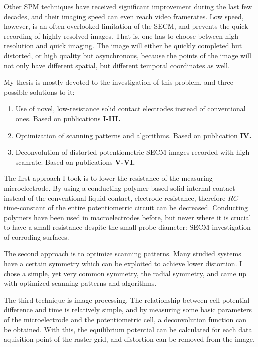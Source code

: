 Other SPM techniques have received significant improvement during the last few decades, and their imaging speed can even reach video framerates.
Low speed, however, is an often overlooked limitation of the SECM, and prevents the quick recording of highly resolved images.
That is, one has to choose between high resolution and quick imaging.
The image will either be quickly completed but distorted, or high quality but asynchronous, because the points of the image will not only have different spatial, but different temporal coordinates as well.

My thesis is mostly devoted to the investigation of this problem, and three possible solutions to it:

\begin{enumerate}
\item Use of novel, low-resistance solid contact electrodes instead of conventional ones.
Based on publications \textbf{\color{blue}I-III.}
\item Optimization of scanning patterns and algorithms.
Based on publication \textbf{\color{blue}IV.}
\item Deconvolution of distorted potentiometric SECM images recorded with high scanrate.
Based on publications \textbf{\color{blue}V-VI.}
\end{enumerate}

The first approach I took is to lower the resistance of the measuring microelectrode.
By using a conducting polymer based solid internal contact instead of the conventional liquid contact, electrode resistance, therefore $RC$ time-constant of the entire potentiometric circuit can be decreased.
Conducting polymers have been used in macroelectrodes before, but never where it is crucial to have a small resistance despite the small probe diameter: SECM investigation of corroding surfaces.

The second approach is to optimize scanning patterns.
Many studied systems have a certain symmetry which can be exploited to achieve lower distortion.
I chose a simple, yet very common symmetry, the radial symmetry, and came up with optimized scanning patterns and algorithms.

The third technique is image processing.
The relationship between cell potential difference and time is relatively simple, and by measuring some basic parameters of the microelectrode and the potentiometric cell, a deconvolution function can be obtained.
With this, the equilibrium potential can be calculated for each data aquisition point of the raster grid, and distortion can be removed from the image.

